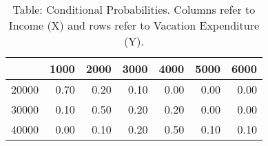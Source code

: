

\begin{table}[ht]
\centering
\caption*{Table: Conditional Probabilities. Columns refer to Income (X) and rows refer to Vacation Expenditure (Y).}
\begin{tabular}{rrrrrrr}
  \hline
 & 1000 & 2000 & 3000 & 4000 & 5000 & 6000 \\ 
  \hline
20000 & 0.70 & 0.20 & 0.10 & 0.00 & 0.00 & 0.00 \\ 
  30000 & 0.10 & 0.50 & 0.20 & 0.20 & 0.00 & 0.00 \\ 
  40000 & 0.00 & 0.10 & 0.20 & 0.50 & 0.10 & 0.10 \\ 
   \hline
\end{tabular}
\end{table}
